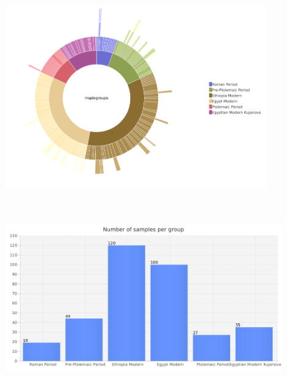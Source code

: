 \documentclass[a0paper,portrait]{baposter}
\begin{document}
\begin{poster}
{	\vspace{2em}

	\begin{minipage}[t]{0.5\textwidth}
		\textbf{}\\
		\includegraphics[width=0.85\textwidth, center]{figures/sunburst2.png}
	\end{minipage}
	\hspace{0.5em}
	\begin{minipage}[t]{0.5\textwidth}
		\textbf{}\\
		\\
		\includegraphics[width=0.9\textwidth, left]{figures/group_sizes.png}
	\end{minipage}

}





\end{poster}
\end{document}
